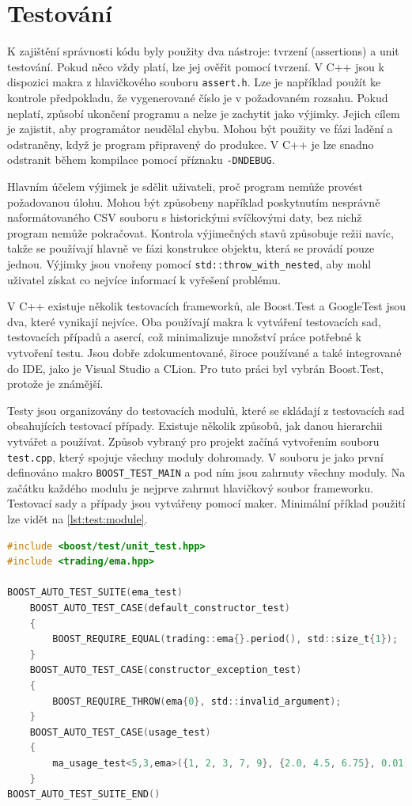 \chapter{Testování}
K zajištění správnosti kódu byly použity dva nástroje: tvrzení (assertions) a unit testování.
Pokud něco vždy platí, lze jej ověřit pomocí tvrzení.
V C++ jsou k dispozici makra z hlavičkového souboru \texttt{assert.h}.
Lze je například použít ke kontrole předpokladu, že vygenerované číslo je v požadovaném rozsahu.
Pokud neplatí, způsobí ukončení programu a nelze je zachytit jako výjimky.
Jejich cílem je zajistit, aby programátor neudělal chybu.
Mohou být použity ve fázi ladění a odstraněny, když je program připravený do produkce.
V C++ je lze snadno odstranit během kompilace pomocí příznaku \texttt{-DNDEBUG}.

Hlavním účelem výjimek je sdělit uživateli, proč program nemůže provést požadovanou úlohu.
Mohou být způsobeny například poskytnutím nesprávně naformátovaného CSV souboru s historickými svíčkovými daty, bez nichž program nemůže pokračovat.
Kontrola výjimečných stavů způsobuje režii navíc, takže se používají hlavně ve fázi konstrukce objektu, která se provádí pouze jednou.
Výjimky jsou vnořeny pomocí \texttt{std::throw\_with\_nested}, aby mohl uživatel získat co nejvíce informací k vyřešení problému.

V C++ existuje několik testovacích frameworků, ale Boost.Test a GoogleTest jsou dva, které vynikají nejvíce.
Oba používají makra k vytváření testovacích sad, testovacích případů a asercí, což minimalizuje množství práce potřebné k vytvoření testu.
Jsou dobře zdokumentované, široce používané a také integrované do IDE, jako je Visual Studio a CLion.
Pro tuto práci byl vybrán Boost.Test, protože je známější.

Testy jsou organizovány do testovacích modulů, které se skládají z testovacích sad obsahujících testovací případy.
Existuje několik způsobů, jak danou hierarchii vytvářet a používat.
Způsob vybraný pro projekt začíná vytvořením souboru \texttt{test.cpp}, který spojuje všechny moduly dohromady.
V souboru je jako první definováno makro \texttt{BOOST\_TEST\_MAIN} a pod ním jsou zahrnuty všechny moduly.
Na začátku každého modulu je nejprve zahrnut hlavičkový soubor frameworku.
Testovací sady a případy jsou vytvářeny pomocí maker.
Minimální příklad použití lze vidět na \ref{lst:test:module}.

\begin{lstlisting}[caption={~Ukázka testovacího modulu},label={lst:test:module},captionpos=t,abovecaptionskip=-\medskipamount,belowcaptionskip=\medskipamount,language=C]
#include <boost/test/unit_test.hpp>
#include <trading/ema.hpp>

BOOST_AUTO_TEST_SUITE(ema_test)
    BOOST_AUTO_TEST_CASE(default_constructor_test)
    {
        BOOST_REQUIRE_EQUAL(trading::ema{}.period(), std::size_t{1});
    }
    BOOST_AUTO_TEST_CASE(constructor_exception_test)
    {
        BOOST_REQUIRE_THROW(ema{0}, std::invalid_argument);
    }
    BOOST_AUTO_TEST_CASE(usage_test)
    {
        ma_usage_test<5,3,ema>({1, 2, 3, 7, 9}, {2.0, 4.5, 6.75}, 0.01);
    }
BOOST_AUTO_TEST_SUITE_END()
\end{lstlisting}

